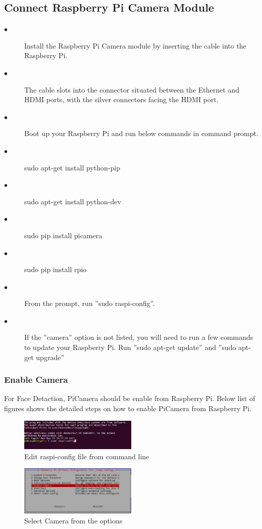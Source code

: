 \documentclass[sigconf]{acmart}
\begin{document}
\subsection{Connect Raspberry Pi Camera Module}
\begin{description}
    \item[$\bullet$] Install the Raspberry Pi Camera module by inserting the cable into the Raspberry Pi.
    \item[$\bullet$] The cable slots into the connector situated between the Ethernet and HDMI ports, with the silver connectors facing the HDMI port.
    \item[$\bullet$] Boot up your Raspberry Pi and run below commands in command prompt.
    \item[$\bullet$] sudo apt-get install python-pip
    \item[$\bullet$] sudo apt-get install python-dev
    \item[$\bullet$] sudo pip install picamera
    \item[$\bullet$] sudo pip install rpio
    \item[$\bullet$] From the prompt, run ''sudo raspi-config''. 
    \item[$\bullet$] If the ''camera'' option is not listed, you will need to run a few commands to update your Raspberry Pi. Run ''sudo apt-get update'' and ''sudo apt-get upgrade''
\end{description}
\subsubsection{Enable Camera}
For Face Detaction, PiCamera should be enable from Raspberry Pi. Below list of figures shows the detailed steps on how to enable PiCamera from Raspberry Pi.

\begin{figure}[ht!]
  \includegraphics[width=0.5\textwidth]{project/images/enablecamera1.jpg}
  \caption{Edit raspi-config file from command line}
\end{figure}

\begin{figure}[ht!]
  \includegraphics[width=0.5\textwidth]{project/images/enablecamera2.jpg}
  \caption{Select Camera from the options}
\end{figure}
\end{document}
